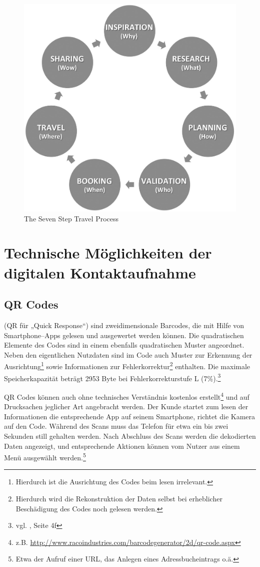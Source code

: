 \begin{figure}[H]
\begin{center}
\includegraphics[width=.5\textwidth]{7stages.jpg}
\caption[The Seven Step Travel Process]{The Seven Step Travel Process\protect\footnotemark}
\label{pic:sevenstages}
\end{center}
\end{figure}





\newpage
\section{Technische Möglichkeiten der digitalen Kontaktaufnahme} %
\label{sec:technologien}

\subsection{QR Codes} %
\label{sub:qr_codes}
 (QR für „Quick Response“) sind zweidimensionale Barcodes, die mit Hilfe von Smartphone–Apps gelesen und ausgewertet werden können. Die quadratischen Elemente des Codes sind in einem ebenfalls quadratischen Muster angeordnet. Neben den eigentlichen Nutzdaten sind im Code auch Muster zur Erkennung der Ausrichtung\footnote{Hierdurch ist die Ausrichtung des Codes beim lesen irrelevant.} sowie Informationen zur Fehlerkorrektur\footnote{Hierdurch wird die Rekonstruktion der Daten selbst bei erheblicher Beschädigung des Codes noch gelesen werden.} enthalten. Die maximale Speicherkapazität beträgt 2953 Byte bei Fehlerkorrekturstufe L (7\%).\footnote{vgl. \cite{iso18004}, Seite 4f}

QR Codes können auch ohne technisches Verständnis kostenlos erstellt\footnote{z.B. \url{http://www.racoindustries.com/barcodegenerator/2d/qr-code.aspx}} und auf Drucksachen jeglicher Art angebracht werden. Der Kunde startet zum lesen der Informationen die entsprechende App auf seinem Smartphone, richtet die Kamera auf den Code. Während des Scans muss das Telefon für etwa ein bis zwei Sekunden still gehalten werden. Nach Abschluss des Scans werden die dekodierten Daten angezeigt, und entsprechende Aktionen können vom Nutzer aus einem Menü ausgewählt werden.\footnote{Etwa der Aufruf einer URL, das Anlegen eines Adressbucheintrags o.ä.} 


